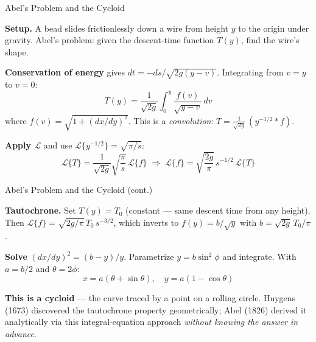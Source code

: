 \documentclass[aspectratio=169,11pt]{beamer}
\begin{document}
\begin{frame}{Abel's Problem and the Cycloid}
\footnotesize
\begin{examplebox}
\textbf{Setup.} A bead slides frictionlessly down a wire from height $y$ to the origin under gravity. Abel's problem: given the descent-time function $T(y)$, find the wire's shape.

\textbf{Conservation of energy} gives $dt = -ds / \sqrt{2g(y-v)}$. Integrating from $v = y$ to $v = 0$:
\[T(y) = \frac{1}{\sqrt{2g}} \int_0^y \frac{f(v)}{\sqrt{y - v}}\, dv\]
where $f(v) = \sqrt{1 + (dx/dy)^2}$. This is a \emph{convolution}: $T = \frac{1}{\sqrt{2g}}\, (y^{-1/2} * f)$.

\textbf{Apply $\mathcal{L}$} and use $\mathcal{L}\{y^{-1/2}\} = \sqrt{\pi/s}$:
\[\mathcal{L}\{T\} = \frac{1}{\sqrt{2g}}\sqrt{\frac{\pi}{s}}\,\mathcal{L}\{f\} \;\Rightarrow\; \mathcal{L}\{f\} = \sqrt{\frac{2g}{\pi}}\, s^{-1/2}\,\mathcal{L}\{T\}\]
\end{examplebox}
\end{frame}

\begin{frame}{Abel's Problem and the Cycloid (cont.)}
\footnotesize
\begin{examplebox}
\textbf{Tautochrone.} Set $T(y) = T_0$ (constant --- same descent time from any height). Then $\mathcal{L}\{f\} = \sqrt{2g/\pi}\, T_0\, s^{-3/2}$, which inverts to $f(y) = b/\sqrt{y}$ with $b = \sqrt{2g}\,T_0/\pi$.

\textbf{Solve} $(dx/dy)^2 = (b-y)/y$. Parametrize $y = b\sin^2\phi$ and integrate. With $a = b/2$ and $\theta = 2\phi$:
\[x = a(\theta + \sin\theta), \quad y = a(1 - \cos\theta)\]

\textbf{This is a cycloid} --- the curve traced by a point on a rolling circle. Huygens (1673) discovered the tautochrone property geometrically; Abel (1826) derived it analytically via this integral-equation approach \emph{without knowing the answer in advance}.
\end{examplebox}
\end{frame}
\end{document}
